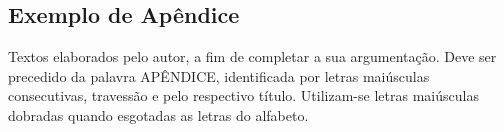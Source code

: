 \begin{apendicesenv}
\chapter{Exemplo de Apêndice}

\label{Apend:Apend1}
Textos elaborados pelo autor, a fim de completar a sua argumentação. Deve ser precedido da palavra APÊNDICE, identificada por letras maiúsculas consecutivas, travessão e pelo respectivo título. Utilizam-se letras maiúsculas dobradas quando esgotadas as letras do alfabeto.

\end{apendicesenv}